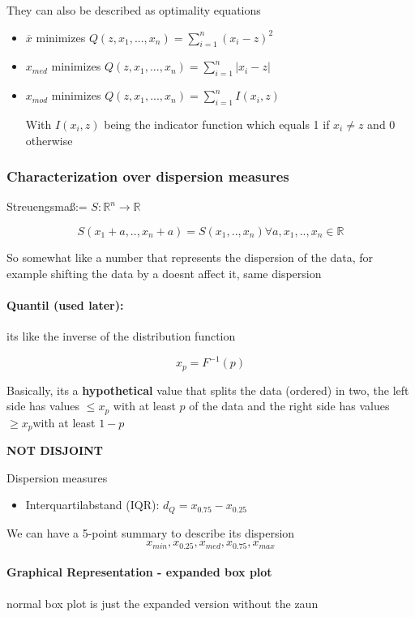\documentclass{article}
\begin{document}
 They can also be described as optimality equations

 \begin{itemize}
    \item $\overline{x}$ minimizes $Q(z,x_1,...,x_n) = \sum_{i=1}^n(x_i-z)^2$
    \item $x_{med}$ minimizes $Q(z,x_1,...,x_n) = \sum_{i=1}^n|x_i-z|$
    \item $x_{mod}$ minimizes $Q(z,x_1,...,x_n) = \sum_{i=1}^nI(x_i,z)$
    
    With $I(x_i,z)$ being the indicator function which equals 1 if $x_i \neq z$ and 0 otherwise

 \end{itemize}
\subsubsection{Characterization over dispersion measures}
Streuengsma\ss := $S:\mathbb{R}^n \to \mathbb{R}$

\[S(x_1+a,..,x_n+a) = S(x_1,..,x_n) \forall a,x_1,..,x_n \in \mathbb{R}\]

So somewhat like a number that represents the dispersion of the data, for example shifting the data by a doesnt affect it, same dispersion

\paragraph{Quantil (used later): } its like the inverse of the distribution function

\[x_p = F^{-1}(p)\]

Basically, its a \textbf{hypothetical} value that splits the data (ordered) in two, the left side has values $\leq x_p$ with at least $p$ of the data and the right side has values  $\geq x_p$with at least $1-p$

\textbf{NOT DISJOINT} 



Dispersion measures

\begin{itemize}
    \item Interquartilabstand (IQR): $d_Q = x_{0.75} -x_{0.25}$
\end{itemize}

We can have a 5-point summary to describe its dispersion
\[x_{min},x_{0.25},x_{med},x_{0.75},x_{max}\]


\paragraph{Graphical Representation - expanded box plot}
normal box plot is just the expanded version without the zaun
\end{document}
